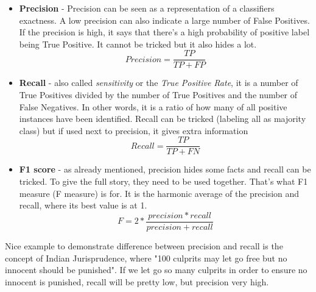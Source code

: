 \begin{itemize}
\item \textbf{Precision} - Precision can be seen as a representation of a classifiers exactness. A low precision can also indicate a large number of False Positives. If the precision is high, it says that there's a high probability of positive label being True Positive. It cannot be tricked but it also hides a lot.
\[ Precision = \frac{TP}{TP + FP}\]
\item \textbf{Recall} - also called \textit{sensitivity} or the \textit{True Positive Rate}, it is a number of True Positives divided by the number of True Positives and the number of False Negatives. In other words, it is a ratio of how many of all positive instances have been identified. Recall can be tricked (labeling all as majority class) but if used next to precision, it gives extra information
\[ Recall = \frac{TP}{TP + FN}\]
\item \textbf{F1 score} - as already mentioned, precision hides some facts and recall can be tricked. To give the full story, they need to be used together. That's what F1 measure (F measure) is for. It is the harmonic average of the precision and recall, where its best value is at 1.
\[ F = 2 * \frac{precision * recall}{precision + recall}\]
\end{itemize}Nice example to demonstrate difference between precision and recall is the concept of Indian Jurisprudence, where "100 culprits may let go free but no innocent should be punished". If we let go so many culprits in order to ensure no innocent is punished, recall will be pretty low, but precision very high.